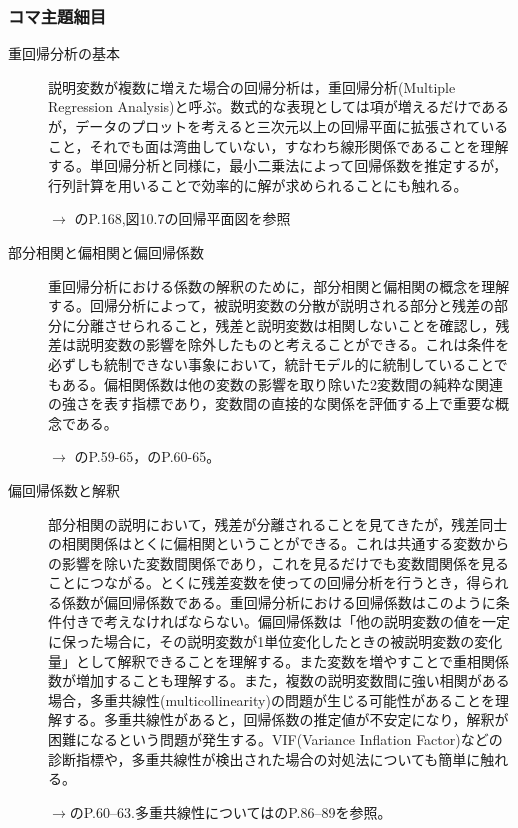 \subsubsection{コマ主題細目}
\begin{description}
	\item[重回帰分析の基本] 説明変数が複数に増えた場合の回帰分析は，重回帰分析(Multiple Regression Analysis)と呼ぶ。数式的な表現としては項が増えるだけであるが，データのプロットを考えると三次元以上の回帰平面に拡張されていること，それでも面は湾曲していない，すなわち線形関係であることを理解する。単回帰分析と同様に，最小二乗法によって回帰係数を推定するが，行列計算を用いることで効率的に解が求められることにも触れる。
	      \begin{flushright}
		      $\to$ \textcite{kosugi2019}のP.168,図10.7の回帰平面図を参照
	      \end{flushright}


	\item[部分相関と偏相関と偏回帰係数] 重回帰分析における係数の解釈のために，部分相関と偏相関の概念を理解する。回帰分析によって，被説明変数の分散が説明される部分と残差の部分に分離させられること，残差と説明変数は相関しないことを確認し，残差は説明変数の影響を除外したものと考えることができる。これは条件を必ずしも統制できない事象において，統計モデル的に統制していることでもある。偏相関係数は他の変数の影響を取り除いた2変数間の純粋な関連の強さを表す指標であり，変数間の直接的な関係を評価する上で重要な概念である。
	      \begin{flushright}
		      $\to$ \textcite{Kawabata201408}のP.59-65，\textcite{Yamada2004}のP.60-65。
	      \end{flushright}

	\item[偏回帰係数と解釈] 部分相関の説明において，残差が分離されることを見てきたが，残差同士の相関関係はとくに偏相関ということができる。これは共通する変数からの影響を除いた変数間関係であり，これを見るだけでも変数間関係を見ることにつながる。とくに残差変数を使っての回帰分析を行うとき，得られる係数が偏回帰係数である。重回帰分析における回帰係数はこのように条件付きで考えなければならない。偏回帰係数は「他の説明変数の値を一定に保った場合に，その説明変数が1単位変化したときの被説明変数の変化量」として解釈できることを理解する。また変数を増やすことで重相関係数が増加することも理解する。また，複数の説明変数間に強い相関がある場合，多重共線性(multicollinearity)の問題が生じる可能性があることを理解する。多重共線性があると，回帰係数の推定値が不安定になり，解釈が困難になるという問題が発生する。VIF(Variance Inflation Factor)などの診断指標や，多重共線性が検出された場合の対処法についても簡単に触れる。
	      \begin{flushright}
		      $\to$\textcite{kosugi2018}のP.60--63.多重共線性については\textcite{Shimizu201705}のP.86--89を参照。
	      \end{flushright}


\end{description}
